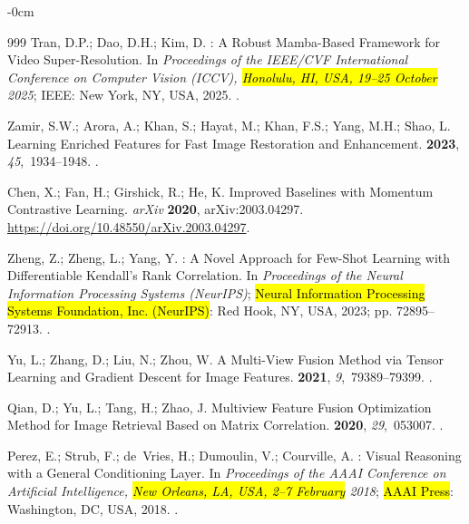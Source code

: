 \documentclass[symmetry,article,accept,pdftex,moreauthors]{Definitions/mdpi}
\begin{document}
\begin{adjustwidth}{-\extralength}{0cm}
\begin{thebibliography}{999}
Tran, D.P.; Dao, D.H.; Kim, D.
: A Robust Mamba-Based Framework for Video Super-Resolution.
\newblock In \emph{Proceedings of the IEEE/CVF International Conference on Computer
  Vision (ICCV), \hl{Honolulu, HI, USA, 19--25 October} 2025}; IEEE: New York, NY, USA,  2025.
 .

Zamir, S.W.; Arora, A.; Khan, S.; Hayat, M.; Khan, F.S.; Yang, M.H.; Shao, L.
\newblock Learning Enriched Features for Fast Image Restoration and
  Enhancement.
  {\bf 2023}, {\em 45},~1934--1948.
.

Chen, X.; Fan, H.; Girshick, R.; He, K.
\newblock Improved Baselines with Momentum Contrastive Learning. \emph{arXiv}  \textbf{2020},  	arXiv:2003.04297.
  \url{ 	
https://doi.org/10.48550/arXiv.2003.04297}.

Zheng, Z.; Zheng, L.; Yang, Y.
: A Novel Approach for Few-Shot Learning with
  Differentiable {Kendall's} Rank Correlation.
\newblock In \emph{Proceedings of the Neural Information Processing Systems
  (NeurIPS)};  \hl{Neural Information Processing Systems Foundation, Inc. (NeurIPS)}: Red Hook, NY, USA,  2023; pp. 72895--72913.
.

Yu, L.; Zhang, D.; Liu, N.; Zhou, W.
\newblock A Multi-View Fusion Method via Tensor Learning and Gradient Descent
  for Image Features.
 {\bf 2021}, {\em 9},~79389--79399.
.

Qian, D.; Yu, L.; Tang, H.; Zhao, J.
\newblock Multiview Feature Fusion Optimization Method for Image Retrieval
  Based on Matrix Correlation.
 {\bf 2020}, {\em 29},~053007.
.

Perez, E.; Strub, F.; de~Vries, H.; Dumoulin, V.; Courville, A.
: Visual Reasoning with a General Conditioning Layer.
\newblock In \emph{Proceedings of the AAAI Conference on Artificial Intelligence, \hl{New Orleans, LA, USA,  2--7 February} 2018}; \hl{AAAI Press}:
  Washington, DC, USA,  2018.
.


\end{thebibliography}
\end{adjustwidth}
\end{document}
